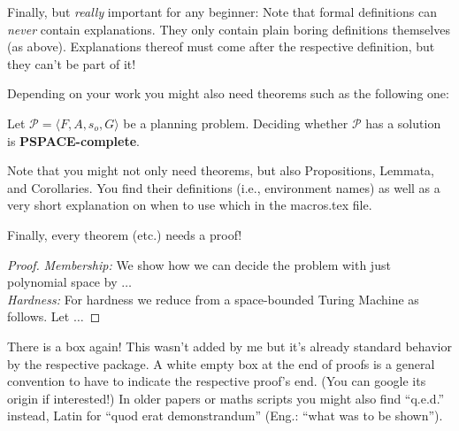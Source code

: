 \begin{itemize}
  Finally, but \emph{really} important for any beginner: Note that formal definitions can \emph{never} contain explanations. They only contain plain boring definitions themselves (as above). Explanations thereof must come after the respective definition, but they can't be part of it!

  Depending on your work you might also need theorems such as the following one:
  \begin{thm}\label{thm:hardnessOfPlanningProblems}%
    Let $\mathcal{P}=\langle F, A, s_o, G\rangle$ be a planning problem. Deciding whether $\mathcal{P}$ has a solution is \textbf{PSPACE-complete}.
  \end{thm}

  Note that you might not only need theorems, but also Propositions, Lemmata, and Corollaries. You find their definitions (i.e., environment names) as well as a very short explanation on when to use which in the macros.tex file.

  Finally, every theorem (etc.) needs a proof!

  \begin{proof}%
    \emph{Membership:} We show how we can decide the problem with just polynomial space by $\dots$\\
    \emph{Hardness:} For hardness we reduce from a space-bounded Turing Machine as follows. Let $\dots$
  \end{proof}

  There is a box again! This wasn't added by me but it's already standard behavior by the respective package. A white empty box at the end of proofs is a general convention to have to indicate the respective proof's end. (You can google its origin if interested!) In older papers or maths scripts you might also find ``q.e.d.'' instead, Latin for ``quod erat demonstrandum'' (Eng.: ``what was to be shown'').


\end{itemize}
